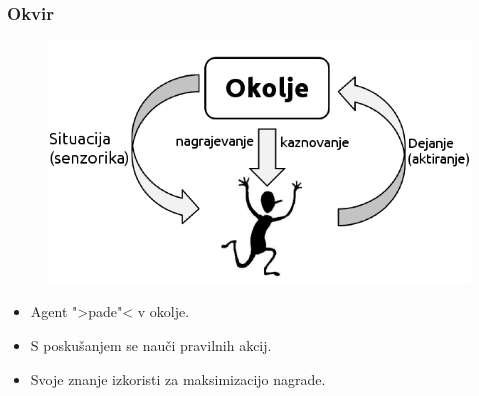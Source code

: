 \documentclass{beamer}    %
\begin{document}
\begin{frame}
    \frametitle{Okvir}
    \begin{figure}
        \includegraphics[scale=0.5]{slike/RLloop.png}
    \end{figure}
    \begin{itemize}
        \item Agent ">pade"< v okolje. 
        \item S poskušanjem se nauči pravilnih akcij.
        \item Svoje znanje izkoristi za maksimizacijo nagrade.
    \end{itemize}
\end{frame}
\end{document}
